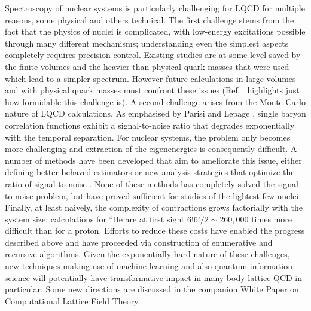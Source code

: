 Spectroscopy of nuclear systems is particularly challenging for LQCD for multiple reasons, some physical and others technical. The first challenge stems from the fact that the physics of nuclei is complicated, with low-energy excitations possible through many different mechanisms; understanding even the simplest aspects completely requires precision control. Existing studies are at some level saved by the finite volumes and the heavier than physical quark masses that were used which lead to a simpler spectrum. However future calculations in large volumes and with physical quark masses must confront these issues (Ref.~\cite{Beane:2012vq} highlights just how formidable this challenge is).
A second challenge arises from the Monte-Carlo nature of LQCD calculations. As emphasised by Parisi and Lepage \cite{Lepage:1989hd,Parisi:1983ae,Hamber:1983vu}, single baryon correlation functions exhibit a signal-to-noise ratio that degrades exponentially with the temporal separation. For nuclear systems, the problem only becomes more challenging \cite{Beane:2009kya,Beane:2009gs} and extraction of the eigenenergies is consequently difficult. A number of methods have been developed that aim to ameliorate this issue, either defining better-behaved estimators \cite{Beane:2014oea,Wagman:2017gqi,Wagman:2017xfh,Wagman:2016bam,Detmold:2018eqd} or new analysis strategies that optimize the ratio of signal to noise \cite{Detmold:2014hla}. None of these methods has completely solved the signal-to-noise problem, but have proved sufficient for studies of the lightest few nuclei. 
Finally, at least naively, the complexity of contractions grows 
factorially with the system size; calculations for $^4$He are at first sight $6!6!/2\sim 260,000$ times  more difficult than for a proton. Efforts to reduce these costs have enabled the progress described above and have proceeded via construction of enumerative \cite{Doi:2012xd,Gunther:2013xj} and recursive \cite{Detmold:2010au,Detmold:2012eu} algorithms. 
Given the exponentially hard nature of these challenges, new techniques making use of machine learning and also quantum information science will potentially have transformative  impact 
in  many body lattice QCD in particular. Some new directions are discussed in the companion White Paper on Computational Lattice Field Theory.


